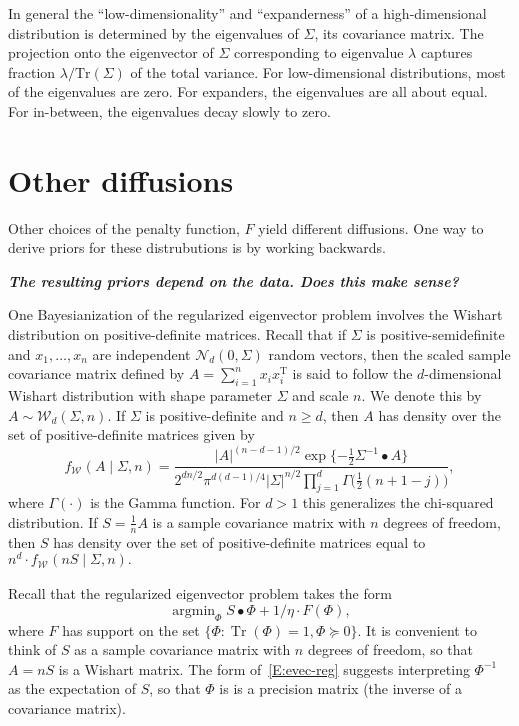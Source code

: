 \documentclass[12pt]{article}
\newcommand{\trans}{\mathrm{T}}
\DeclareMathOperator*{\Tr}{Tr}
\newcommand{\Normal}[1][]{\mathcal{N}_{#1}}
\newcommand{\Wishart}[1][]{\mathcal{W}_{#1}}
\DeclareMathOperator*{\argmin}{argmin}
\theoremstyle{plain}
\begin{document}
In general the ``low-dimensionality'' and ``expanderness'' of a
high-dimensional distribution is determined by the eigenvalues of $\Sigma$,
its covariance matrix.  The projection onto the eigenvector of $\Sigma$
corresponding to eigenvalue $\lambda$ captures fraction
$\lambda / \mathrm{Tr}(\Sigma)$ of the total variance.  For low-dimensional
distributions, most of the eigenvalues are zero.  For expanders, the
eigenvalues are all about equal.  For in-between, the eigenvalues decay
slowly to zero.


\section{Other diffusions}

Other choices of the penalty function, $F$ yield different diffusions.  One way to derive priors for these distrubutions is by working backwards.

\textit{\textbf{The resulting priors depend on the data.  Does this make sense?}}


One Bayesianization of the regularized eigenvector problem involves the Wishart
distribution on positive-definite matrices.  Recall that if $\Sigma$ is
positive-semidefinite and $x_1, \ldots, x_n$ are independent
$\Normal[d](0, \Sigma)$ random vectors, then the scaled sample covariance matrix
defined by $A = \sum_{i=1}^n x_i x_i^\trans$ is said to follow the $d$-dimensional
Wishart distribution with shape parameter $\Sigma$ and scale $n$.  We denote
this by $A \sim \Wishart[d](\Sigma, n)$.  If $\Sigma$ is positive-definite and $n \geq d$, then
$A$ has density over the set of positive-definite matrices given by
\[
    f_{\Wishart}(A \mid \Sigma, n)
    =
    \frac{
        |A|^{(n-d-1)/2} \exp\{-\tfrac{1}{2} \Sigma^{-1} \bullet A \}
    }{
        2^{dn/2} \pi^{d(d-1)/4}
        |\Sigma|^{n/2}
        \prod_{j=1}^{d} \Gamma\big(\tfrac{1}{2} (n + 1 - j)\big)
    },
\]
where $\Gamma(\cdot)$ is the Gamma function.  For $d > 1$ this generalizes the
chi-squared distribution.  If $S = \tfrac{1}{n} A$ is a sample covariance matrix
with $n$ degrees of freedom, then $S$ has density over the set of
positive-definite matrices equal to
\(
    n^d \cdot f_{\Wishart}(n S \mid \Sigma, n).
\)

Recall that the regularized eigenvector problem takes the form
\begin{equation}\label{E:evec-reg}
    \argmin_{\Phi}
        S \bullet \Phi
        +
        1/\eta \cdot F(\Phi),
\end{equation}
where $F$ has support on the set 
\(
    \{ \Phi : \Tr(\Phi) = 1, \Phi \succeq 0 \}.
\)
It is convenient to think of $S$ as a sample covariance matrix with $n$ degrees
of freedom, so that $A = n S$ is a Wishart matrix.
The form of~\eqref{E:evec-reg} suggests interpreting $\Phi^{-1}$ as the
expectation of $S$, so that $\Phi$ is is a precision matrix
(the inverse of a covariance matrix).
\end{document}
